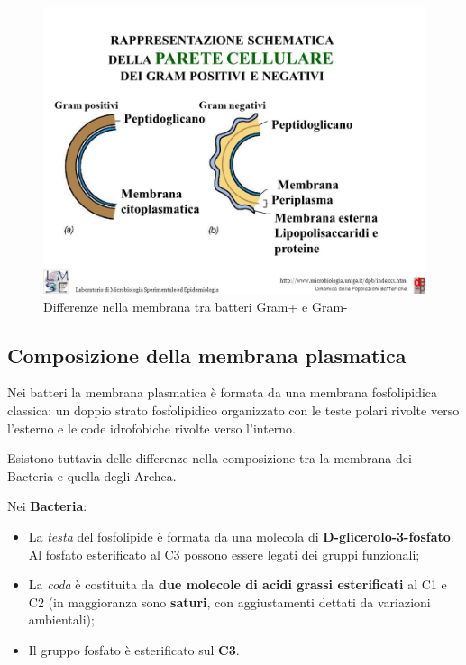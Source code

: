 \documentclass[11pt]{book}
\begin{document}
\clearpage
\begin{figure}[htp]
\centering
\includegraphics[scale=0.40]{img/Parete_cellulare.jpg}
\caption{Differenze nella membrana tra batteri Gram+ e Gram-}
\label{parete_cellulare}
\end{figure}


\subsection{Composizione della membrana plasmatica}
Nei batteri la membrana plasmatica è formata da una membrana fosfolipidica classica: un doppio strato fosfolipidico organizzato con le teste polari rivolte verso l'esterno e le code idrofobiche rivolte verso l'interno.

Esistono tuttavia delle differenze nella composizione tra la membrana dei Bacteria e quella degli Archea.

\vspace{1em}
Nei \textbf{Bacteria}:
\begin{itemize}
\item La \emph{testa} del fosfolipide è formata da una molecola di \textbf{D-glicerolo-3-fosfato}. Al fosfato esterificato al C3 possono essere legati dei gruppi funzionali;
\item La \emph{coda} è costituita da \textbf{due molecole di acidi grassi esterificati} al C1 e C2 (in maggioranza sono \textbf{saturi}, con aggiustamenti dettati da variazioni ambientali);
\item Il gruppo fosfato è esterificato sul \textbf{C3}.
\end{itemize}
\end{document}
